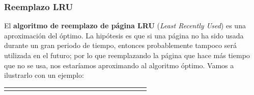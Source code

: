 \subsubsection{Reemplazo LRU}\label{_reemplazo_lru}

{} {} El \textbf{algoritmo de reemplazo de página {}LRU} (\emph{Least
Recently Used}) es una aproximación del óptimo. La hipótesis es que si
una página no ha sido usada durante un gran periodo de tiempo, entonces
probablemente tampoco será utilizada en el futuro; por lo que
reemplazando la página que hace más tiempo que no se usa, nos estaríamos
aproximando al algoritmo óptimo. Vamos a ilustrarlo con un ejemplo:

\begin{longtable}[]{@{}
  >{\raggedright\arraybackslash}p{}
  >{\raggedright\arraybackslash}p{}
  >{\raggedright\arraybackslash}p{}
  >{\raggedright\arraybackslash}p{}
  >{\raggedright\arraybackslash}p{}
  >{\raggedright\arraybackslash}p{}
  >{\raggedright\arraybackslash}p{}
  >{\raggedright\arraybackslash}p{}
  >{\raggedright\arraybackslash}p{}
  >{\raggedright\arraybackslash}p{}
  >{\raggedright\arraybackslash}p{}
  >{\raggedright\arraybackslash}p{}
  >{\raggedright\arraybackslash}p{}
  >{\raggedright\arraybackslash}p{}
  >{\raggedright\arraybackslash}p{}
  >{\raggedright\arraybackslash}p{}
  >{\raggedright\arraybackslash}p{}
  >{\raggedright\arraybackslash}p{}
  >{\raggedright\arraybackslash}p{}
  >{\raggedright\arraybackslash}p{}@{}}
\toprule\noalign{}
\begin{minipage}[b]{\linewidth}\centering
7
\end{minipage} & \begin{minipage}[b]{\linewidth}\centering

\end{minipage}
\end{longtable}
